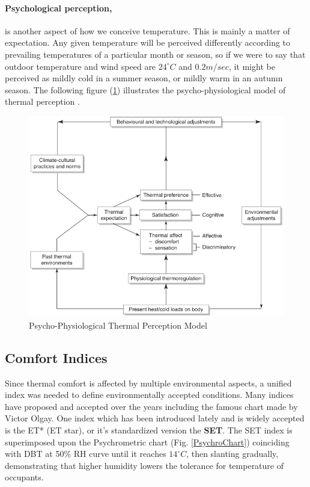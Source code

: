 \documentclass[a4paper,twoside,12pt,openright,final,oldfontcommands]{memoir}
\begin{document}
\paragraph{Psychological perception,}is another aspect of how we conceive temperature. This is
mainly a matter of expectation. Any given temperature will be perceived differently according to
prevailing temperatures of a particular month or season, so if we were to say that outdoor
temperature and wind speed are $24^\circ C$ and $0.2 m/sec$, it might be perceived as mildly cold in
a summer season, or mildly warm in an autumn season. The following figure
(\ref{PsychoPhysioModel}) illustrates the psycho-physiological model of thermal perception
\cite{szokolay08}.

\begin{figure}[htbp]
\includegraphics[width=13.5cm]{./Images/2-PsychoPhysioModel}
\caption[Psycho-Physiological Thermal Perception Model]{Psycho-Physiological Thermal Perception
Model \cite{szokolay08} \label{PsychoPhysioModel}}
\end{figure}

\subsection{Comfort Indices}
Since thermal comfort is affected by multiple environmental aspects, a unified index was needed to
define environmentally accepted conditions. Many indices have proposed and accepted over the years
including the famous chart made by Victor Olgay. One index which has been introduced lately and is
widely accepted is the ET* (ET star), or it's standardized version the \textbf{SET}. The SET index
is superimposed upon the Psychrometric chart (Fig. \ref{PsychroChart}) coinciding with DBT at 50\%
RH curve until it reaches $14^\circ C$, then slanting gradually, demonstrating that higher humidity
lowers the tolerance for temperature of occupants.
\end{document}
